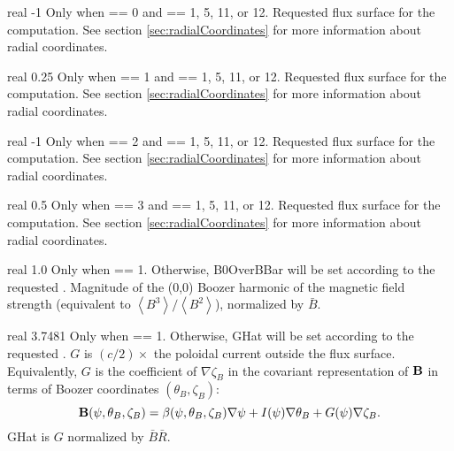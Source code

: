 \myhrule

{real}
{-1}
{Only when  == 0 and  == 1, 5, 11, or 12.}
{Requested flux surface for the computation.  See section \ref{sec:radialCoordinates}
for more information about radial coordinates.}

\myhrule

{real}
{0.25}
{Only when  == 1 and  == 1, 5, 11, or 12.}
{Requested flux surface for the computation.  See section \ref{sec:radialCoordinates}
for more information about radial coordinates.}

\myhrule

{real}
{-1}
{Only when  == 2 and  == 1, 5, 11, or 12.}
{Requested flux surface for the computation.  See section \ref{sec:radialCoordinates}
for more information about radial coordinates.}

\myhrule

{real}
{0.5}
{Only when  == 3 and  == 1, 5, 11, or 12.}
{Requested flux surface for the computation.  See section \ref{sec:radialCoordinates}
for more information about radial coordinates.}

\myhrule

{real}
{1.0}
{Only when  == 1. Otherwise, {\ttfamily B0OverBBar} will be set according to the requested .}
{Magnitude of the (0,0) Boozer harmonic of the magnetic field strength (equivalent to $\left< B^3\right>/\left<B^2\right>$), normalized by $\bar{B}$.}

\myhrule

{real}
{3.7481}
{Only when  == 1. Otherwise, {\ttfamily GHat} will be set according to the requested .}
{$G$ is $(c/2)\times$ the poloidal current outside the flux
 surface. Equivalently, $G$ is the coefficient of $\nabla\zeta_B$ in the
 covariant representation of ${\mathbf B}$ in terms of Boozer coordinates $(\theta_B,\zeta_B)$:
\begin{equation}
\label{eq:covariant}
{\mathbf B}(\psi,\theta_B,\zeta_B) = \beta(\psi,\theta_B,\zeta_B)\nabla\psi + I(\psi)\nabla\theta_B + G(\psi)\nabla\zeta_B.
\end{equation}
{\ttfamily GHat} is $G$ normalized by $\bar{B}\bar{R}$.}


